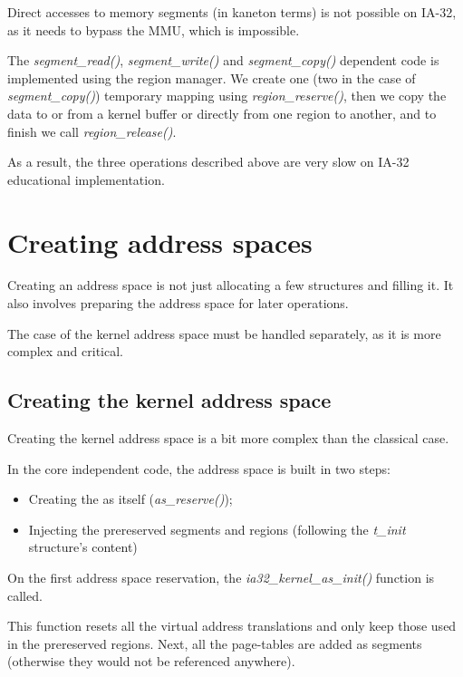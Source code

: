 Direct accesses to memory segments (in kaneton terms) is not possible
on IA-32, as it needs to bypass the MMU, which is impossible.

The \textit{segment\_read()}, \textit{segment\_write()} and
\textit{segment\_copy()} dependent code is implemented using the
region manager. We create one (two in the case of
\textit{segment\_copy()}) temporary mapping using
\textit{region\_reserve()}, then we copy the data to or from a kernel
buffer or directly from one region to another, and to finish we call
\textit{region\_release()}.

As a result, the three operations described above are very slow on
IA-32 educational implementation.

%
%

\section{Creating address spaces}

Creating an address space is not just allocating a few structures and
filling it. It also involves preparing the address space for later
operations.

The case of the kernel address space must be handled separately, as it
is more complex and critical.

%
%

\subsection{Creating the kernel address space}

Creating the kernel address space is a bit more complex than the
classical case.

In the core independent code, the address space is built in two steps:

\begin{itemize}
\item
  Creating the as itself (\textit{as\_reserve()});
\item
  Injecting the prereserved segments and regions (following the
  \textit{t\_init} structure's content)
\end{itemize}

On the first address space reservation, the
\textit{ia32\_kernel\_as\_init()} function is called.

This function resets all the virtual address translations and only
keep those used in the prereserved regions. Next, all the page-tables
are added as segments (otherwise they would not be referenced
anywhere).

